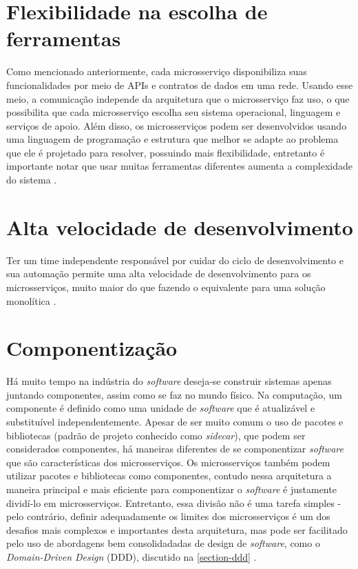 

\section{Flexibilidade na escolha de ferramentas}

Como mencionado anteriormente, cada microsserviço disponibiliza suas funcionalidades por meio de APIs e contratos de dados em uma rede. Usando esse meio, a comunicação independe da arquitetura que o microsserviço faz uso, o que possibilita que cada microsserviço escolha seu sistema operacional, linguagem e serviços de apoio. Além disso, os microsserviços podem ser desenvolvidos usando uma linguagem de programação e estrutura que melhor se adapte ao problema que ele é projetado para resolver, possuindo mais flexibilidade, entretanto é importante notar que usar muitas ferramentas diferentes aumenta a complexidade do sistema \cite{oracle_microservices, Familiar2015}.

\section{Alta velocidade de desenvolvimento}

Ter um time independente responsável por cuidar do ciclo de desenvolvimento e sua automação permite uma alta velocidade de desenvolvimento para os microsserviços, muito maior do que fazendo o equivalente para uma solução monolítica \cite{Familiar2015}.

\section{Componentização}\label{secao-componentizacao}

Há muito tempo na indústria do \emph{software} deseja-se construir sistemas apenas juntando componentes, assim como se faz no mundo físico. Na computação, um componente é definido como uma unidade de \emph{software} que é atualizável e substituível independentemente. Apesar de ser muito comum o uso de pacotes e bibliotecas (padrão de projeto conhecido como \emph{sidecar}), que podem ser considerados componentes, há maneiras diferentes de se componentizar \emph{software} que são características dos microsserviços. Os microsserviços também podem utilizar pacotes e bibliotecas como componentes, contudo nessa arquitetura a maneira principal e mais eficiente para componentizar o \emph{software} é justamente dividí-lo em microsserviços. Entretanto, essa divisão não é uma tarefa simples - pelo contrário, definir adequadamente os limites dos microsserviços é um dos desafios mais complexos e importantes desta arquitetura, mas pode ser facilitado pelo uso de abordagens bem consolidadadas de design de \emph{software}, como o \emph{Domain-Driven Design} (DDD), discutido na \autoref{section-ddd} \cite{martin-fowler-microservices}.


